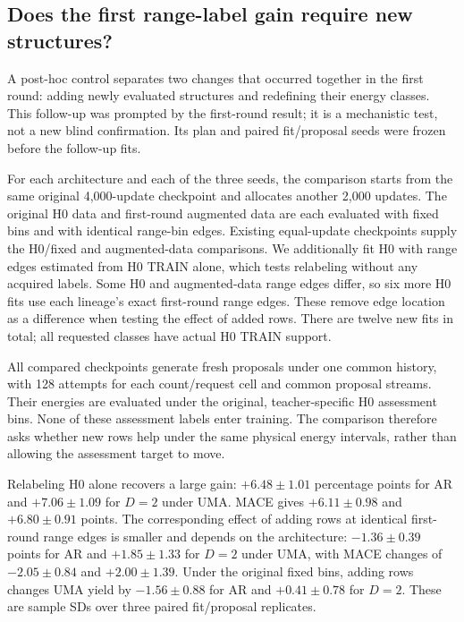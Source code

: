 \subsection{Does the first range-label gain require new structures?}
A post-hoc control separates two changes that occurred together in the first
round: adding newly evaluated structures and redefining their energy classes.
This follow-up was prompted by the first-round result; it is a mechanistic
test, not a new blind confirmation. Its plan and paired fit/proposal seeds were
frozen before the follow-up fits.

For each architecture and each of the three seeds, the comparison starts from
the same original 4,000-update checkpoint and allocates another 2,000 updates.
The original H0 data and first-round augmented data are each evaluated with
fixed bins and with identical range-bin edges. Existing equal-update
checkpoints supply the H0/fixed and augmented-data comparisons. We additionally
fit H0 with range edges estimated from H0 TRAIN alone, which tests relabeling
without any acquired labels. Some H0 and augmented-data range edges differ,
so six more H0 fits use each lineage's exact first-round range edges. These
remove edge location as a difference when testing the effect of added rows.
There are twelve new fits in total; all requested classes have actual H0
TRAIN support.

All compared checkpoints generate fresh proposals under one common history,
with 128 attempts for each count/request cell and common proposal streams.
Their energies are evaluated under the original, teacher-specific H0
assessment bins. None of these assessment labels enter training. The
comparison therefore asks whether new rows help under the same physical
energy intervals, rather than allowing the assessment target to move.



Relabeling H0 alone recovers a large gain: $+6.48\pm1.01$ percentage points for
AR and $+7.06\pm1.09$ for $D=2$ under UMA. MACE gives
$+6.11\pm0.98$ and $+6.80\pm0.91$ points. The corresponding effect of adding
rows at identical first-round range edges is smaller and depends on the
architecture: $-1.36\pm0.39$ points for AR and $+1.85\pm1.33$ for $D=2$
under UMA, with MACE changes of $-2.05\pm0.84$ and $+2.00\pm1.39$.
Under the original fixed bins, adding rows changes UMA yield by
$-1.56\pm0.88$ for AR and $+0.41\pm0.78$ for $D=2$.
These are sample SDs over three paired fit/proposal replicates.


